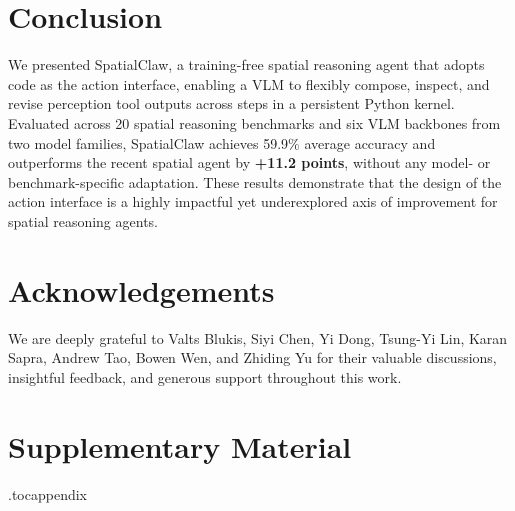 \documentclass{llmxive}
\providecommand{\ours}{SpatialClaw}
\begin{document}
\section{Conclusion}
We presented \ours{}, a training-free spatial reasoning agent that adopts code as the action interface, enabling a VLM to flexibly compose, inspect, and revise perception tool outputs across steps in a persistent Python kernel.
Evaluated across 20 spatial reasoning benchmarks and six VLM backbones from two model families, \ours{} achieves 59.9\% average accuracy and outperforms the recent spatial agent by \textbf{+11.2 points}, without any model- or benchmark-specific adaptation.
These results demonstrate that the design of the action interface is a highly impactful yet underexplored axis of improvement for spatial reasoning agents.


\section*{Acknowledgements}
We are deeply grateful to Valts Blukis, Siyi Chen, Yi Dong, Tsung-Yi Lin, Karan Sapra, Andrew Tao, Bowen Wen, and Zhiding Yu for their valuable discussions, insightful feedback, and generous support throughout this work.



\appendix

\section*{Supplementary Material}


\begingroup
\noindent
\vspace{0.6em}

\etocdepthtag.toc{appendix}
  {}
  {}
  {\noindent\makebox[1.6em][l]{\bfseries\etocnumber}\bfseries\etocname\dotfill\etocpage\par}
  {}
  {}
  {}
  {\noindent\hspace*{1.6em}{\normalfont\makebox[2.0em][l]{\etocnumber}\etocname}\dotfill\etocpage\par}
  {}
{\small\tableofcontents}
\endgroup
\end{document}
